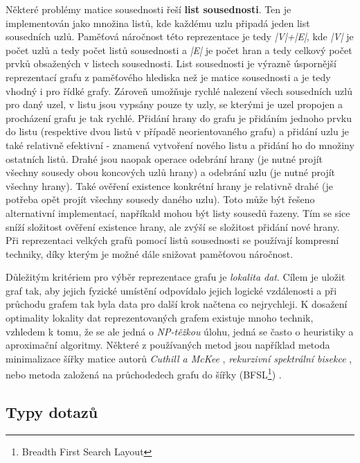 Některé problémy matice sousednosti řeší \textbf{list sousednosti}. Ten je implementován jako množina listů, kde každému uzlu připadá jeden list sousedních uzlů. Paměťová náročnost této reprezentace je tedy \textit{|V|+|E|}, kde \textit{|V|} je počet uzlů a tedy počet listů sousednosti a \textit{|E|} je počet hran a tedy celkový počet prvků obsažených v listech sousednosti. List sousednosti je výrazně úspornější reprezentací grafu z paměťového hlediska než je matice sousednosti a je tedy vhodný i pro řídké grafy. Zároveň umožňuje rychlé nalezení všech sousedních uzlů pro daný uzel, v listu jsou vypsány pouze ty uzly, se kterými je uzel propojen a procházení grafu je tak rychlé. Přidání hrany do grafu je přidáním jednoho prvku do listu (respektive dvou listů v případě neorientovaného grafu) a přidání uzlu je také relativně efektivní - znamená vytvoření nového listu a přidání ho do množiny ostatních listů. Drahé jsou naopak operace odebrání hrany (je nutné projít všechny sousedy obou koncových uzlů hrany) a odebrání uzlu (je nutné projít všechny hrany). Také ověření existence konkrétní hrany je relativně drahé (je potřeba opět projít všechny sousedy daného uzlu). Toto může být řešeno alternativní implementací, napříkald mohou být listy sousedů řazeny. Tím se sice sníží složitost ověření existence hrany, ale zvýší se složitost přidání nové hrany.
Při reprezentaci velkých grafů pomocí listů sousednosti se používají kompresní techniky, díky kterým je možné dále snižovat paměťovou náročnost.\cite{Boldi04} 



Důležitým kritériem pro výběr reprezentace grafu je \textit{lokalita dat}. Cílem je uložit graf tak, aby jejich fyzické umístění odpovídalo jejich logické vzdálenosti a při průchodu grafem tak byla data pro další krok načtena co nejrychleji. K dosažení optimality lokality dat reprezentovaných grafem existuje mnoho technik, vzhledem k tomu, že se ale jedná o \textit{NP-těžkou} úlohu, jedná se často o heuristiky a aproximační algoritmy. Některé z používaných metod jsou například metoda minimalizace šířky matice autorů \textit{Cuthill a McKee} \cite{Cuthill69}, \textit{rekurzivní spektrální bisekce} \cite{Barnard93}, nebo metoda založená na průchodedech grafu do šířky (BFSL\footnote{Breadth First Search Layout}) \cite{Furaih98}.


\subsection{Typy dotazů}
\label{sec:gdb-dotazy}

